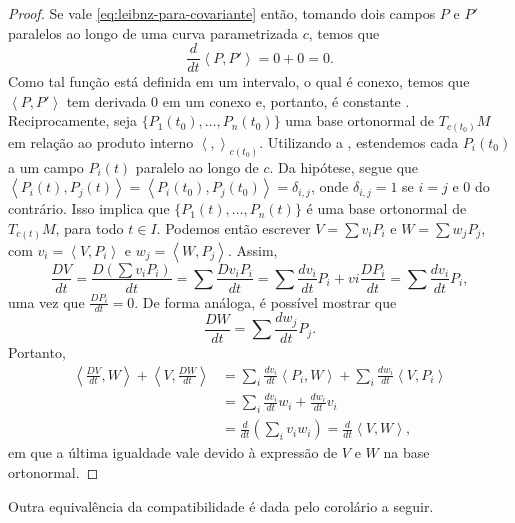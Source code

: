 \begin{proposition}
\begin{proof}
		Se vale \eqref{eq:leibnz-para-covariante} então, tomando dois campos $P$ e $P'$ paralelos ao longo de uma curva parametrizada $c$, temos que
		\begin{equation*}
			\frac{d}{dt}\left<P,P'\right>=0+0 = 0.
		\end{equation*}
		Como tal função está definida em um intervalo, o qual é conexo, temos que $\left<P,P'\right>$ tem derivada $0$ em um conexo e, portanto, é constante \cite{munkres2000topology}.
		Reciprocamente, seja $\{ P_{1}(t_{0}), \dots, P_{n}(t_{0}) \}$ uma base ortonormal de $T_{c(t_{0})}M$ em relação ao produto interno $\left<,\right>_{c(t_{0})}$.
		Utilizando a , estendemos cada $P_{i}(t_{0})$ a um campo $P_{i}(t)$ paralelo ao longo de $c$.
		Da hipótese, segue que $\left<P_{i}(t),P_{j}(t)\right>=\left<P_{i}(t_{0}),P_{j}(t_{0})\right>=\delta_{i,j}$, onde $\delta_{i,j}=1$ se $i=j$ e $0$ do contrário. Isso implica que $\{ P_{1}(t), \dots, P_{n}(t) \}$ é uma base ortonormal de $T_{c(t)}M$, para todo $t \in I$.
		Podemos então escrever $V=\sum v_{i}P_{i}$ e $W=\sum w_{j}P_{j}$, com $v_{i}=\left<V,P_{i}\right>$ e $w_{j}=\left<W,P_{j}\right>$.
		Assim,
		\begin{equation*}
			\frac{DV}{dt}=\frac{D\left( \sum v_{i}P_{i} \right)}{dt}=\sum\frac{Dv_{i}P_{i}}{dt}=\sum \frac{dv_{i}}{dt}P_{i}+vi\frac{DP_{i}}{dt} = \sum\frac{dv_{i}}{dt}P_{i},
		\end{equation*}
		uma vez que $\frac{DP_{i}}{dt}=0$.
		De forma análoga, é possível mostrar que
		\begin{equation*}
			\frac{DW}{dt}=\sum\frac{dw_{j}}{dt}P_{j}.
		\end{equation*}
		Portanto,
		\begin{align*}
			\left<\frac{DV}{dt},W\right> + \left<V,\frac{DW}{dt}\right> & = \sum_{i}\frac{dv_{i}}{dt}\left<P_{i},W\right> + \sum_{i}\frac{dw_{i}}{dt}\left<V,P_{i}\right> \\
			                                                            & = \sum_{i} \frac{dv_{i}}{dt}w_{i} + \frac{dw_{i}}{dt}v_{i}                                      \\
			                                                            & = \frac{d}{dt}\left( \sum_{i}v_{i}w_{i} \right)  = \frac{d}{dt}\left<V,W\right>  ,
		\end{align*}
		em que a última igualdade vale devido à expressão de $V$ e $W$ na base ortonormal.
	\end{proof}
\end{proposition}
Outra equivalência da compatibilidade é dada pelo corolário a seguir.

